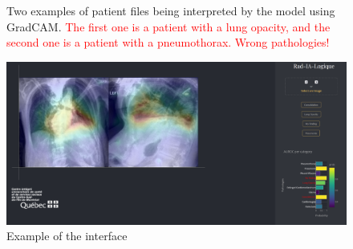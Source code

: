 \documentclass[11pt]{article}
\newcommand\myworries[1]{\textcolor{red}{#1}}
\begin{document}
\begin{figure}[H]
\begin{subfigure}[b]{\textwidth}
                 \end{subfigure}
                 \label{fig:gradcam_example_chexpert_5}
                 \caption{Two examples of patient files being interpreted by the model using GradCAM. \myworries{The first one is a patient with a lung opacity, and the second one is a patient with a pneumothorax. Wrong pathologies!}}

            \end{figure}

            \begin{landscape}
            \begin{figure}
                \centering
                \includegraphics[width=\linewidth]{plots/webapp}
                \caption{Example of the interface}
                \label{fig:interface}
            \end{figure}
            \end{landscape}
    \newpage
    {
    \small

    \printbibliography
    }
\end{document}

